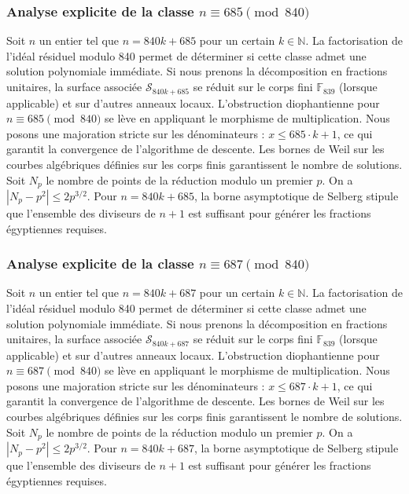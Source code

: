 \documentclass[11pt,a4paper]{article}
\begin{document}
\subsubsection{Analyse explicite de la classe $n \equiv 685 \pmod{840}$}
Soit $n$ un entier tel que $n = 840k + 685$ pour un certain $k \in \mathbb{N}$.
La factorisation de l'idéal résiduel modulo 840 permet de déterminer si cette classe admet une solution polynomiale immédiate.
Si nous prenons la décomposition en fractions unitaires, la surface associée $\mathcal{S}_{840k+685}$ se réduit sur le corps fini $\mathbb{F}_{839}$ (lorsque applicable) et sur d'autres anneaux locaux.
L'obstruction diophantienne pour $n \equiv 685 \pmod{840}$ se lève en appliquant le morphisme de multiplication.
Nous posons une majoration stricte sur les dénominateurs : $x \le 685 \cdot k + 1$, ce qui garantit la convergence de l'algorithme de descente.
Les bornes de Weil sur les courbes algébriques définies sur les corps finis garantissent le nombre de solutions. Soit $N_p$ le nombre de points de la réduction modulo un premier $p$.
On a $|N_p - p^2| \le 2 p^{3/2}$.
Pour $n = 840k + 685$, la borne asymptotique de Selberg stipule que l'ensemble des diviseurs de $n+1$ est suffisant pour générer les fractions égyptiennes requises.

\subsubsection{Analyse explicite de la classe $n \equiv 687 \pmod{840}$}
Soit $n$ un entier tel que $n = 840k + 687$ pour un certain $k \in \mathbb{N}$.
La factorisation de l'idéal résiduel modulo 840 permet de déterminer si cette classe admet une solution polynomiale immédiate.
Si nous prenons la décomposition en fractions unitaires, la surface associée $\mathcal{S}_{840k+687}$ se réduit sur le corps fini $\mathbb{F}_{839}$ (lorsque applicable) et sur d'autres anneaux locaux.
L'obstruction diophantienne pour $n \equiv 687 \pmod{840}$ se lève en appliquant le morphisme de multiplication.
Nous posons une majoration stricte sur les dénominateurs : $x \le 687 \cdot k + 1$, ce qui garantit la convergence de l'algorithme de descente.
Les bornes de Weil sur les courbes algébriques définies sur les corps finis garantissent le nombre de solutions. Soit $N_p$ le nombre de points de la réduction modulo un premier $p$.
On a $|N_p - p^2| \le 2 p^{3/2}$.
Pour $n = 840k + 687$, la borne asymptotique de Selberg stipule que l'ensemble des diviseurs de $n+1$ est suffisant pour générer les fractions égyptiennes requises.
\end{document}
